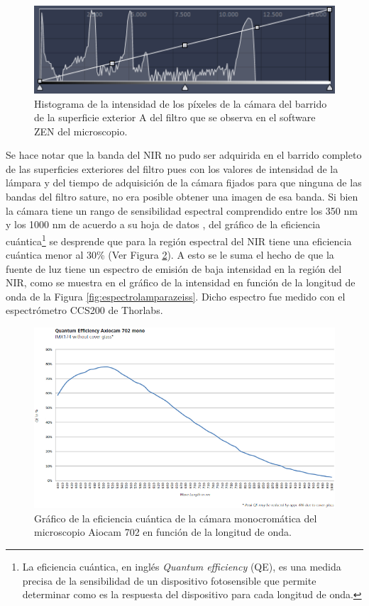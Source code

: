 \begin{figure}[H]
	\centering
	\includegraphics[width=1.0\textwidth]{Figs/defectosZEISS/histograma15x15.png}
	\caption{Histograma de la intensidad de los píxeles de la cámara del barrido de la superficie exterior A del filtro que se observa en el software ZEN del microscopio.}
	\label{fig:histograma15x15}
\end{figure}
Se hace notar que la banda del NIR no pudo ser adquirida en el barrido completo de las superficies exteriores del filtro pues con los valores de intensidad de la lámpara y del tiempo de adquisición de la cámara fijados para que ninguna de las bandas del filtro sature, no era posible obtener una imagen de esa banda. Si bien la cámara tiene un rango de sensibilidad espectral comprendido entre los 350 nm y los 1000 nm de acuerdo a su hoja de datos \cite{Zeiss}, del gráfico de la eficiencia cuántica\footnote{La eficiencia cuántica, en inglés \textit{Quantum efficiency} (QE), es una medida precisa de la sensibilidad de un dispositivo fotosensible que permite determinar como es la respuesta del dispositivo para cada longitud de onda.} se desprende que para la región espectral del NIR tiene una eficiencia cuántica menor al 30\% (Ver Figura \ref{fig:eficienciacuanticamara}). A esto se le suma el hecho de que la fuente de luz tiene un espectro de emisión de baja intensidad en la región del NIR, como se muestra en el gráfico de la intensidad en función de la longitud de onda de la Figura \ref{fig:espectrolamparazeiss}. Dicho espectro fue medido con el espectrómetro CCS200 de Thorlabs. 


\begin{figure}[H]
	\centering
	\includegraphics[width=1.0\textwidth]{Figs/defectosZEISS/eficienciacuanticacamarazeiss.png}
	\caption{Gráfico de la eficiencia cuántica de la cámara monocromática del microscopio Aiocam 702 en función de la longitud de onda.}
	\label{fig:eficienciacuanticamara}
\end{figure}



